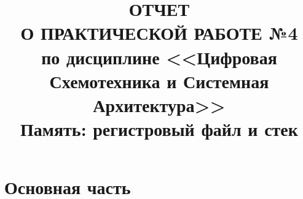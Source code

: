 \documentclass[a4paper]{article}
\title{
  ОТЧЕТ \\
  О ПРАКТИЧЕСКОЙ РАБОТЕ №4 \\
  по дисциплине <<Цифровая Схемотехника и Системная Архитектура>> \\
  Память: регистровый файл и стек
}
\begin{document}
  \templatedtitlepage
  
  \toc
  
  \section{Основная часть}
\end{document}
